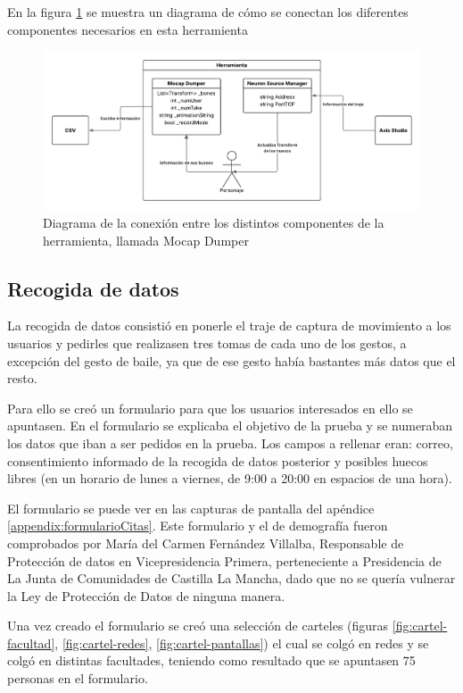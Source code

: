 En la figura \ref{fig:MocapDumper} se muestra un diagrama de cómo se conectan los diferentes componentes necesarios en esta herramienta

\begin{figure}[H]
	\centering
	\includegraphics[width=1\textwidth]{Imagenes/Vectorial/MocapDumper.pdf}
	\caption{Diagrama de la conexión entre los distintos componentes de la herramienta, llamada Mocap Dumper}
	\label{fig:MocapDumper}
\end{figure}

\subsection{Recogida de datos}
La recogida de datos consistió en ponerle el traje de captura de movimiento a los usuarios y pedirles que realizasen tres tomas de cada uno de los gestos, a excepción del gesto de baile, ya que de ese gesto había bastantes más datos que el resto.

Para ello se creó un formulario para que los usuarios interesados en ello se apuntasen. En el formulario se explicaba el objetivo de la prueba y se numeraban los datos que iban a ser pedidos en la prueba. Los campos a rellenar eran: correo, consentimiento informado de la recogida de datos posterior y posibles huecos libres (en un horario de lunes a viernes, de 9:00 a 20:00 en espacios de una hora).

El formulario se puede ver en las capturas de pantalla del apéndice \ref{appendix:formularioCitas}. Este formulario y el de demografía fueron comprobados por María del Carmen Fernández Villalba, Responsable de Protección de datos en Vicepresidencia Primera, perteneciente a Presidencia de La Junta de Comunidades de Castilla La Mancha, dado que no se quería vulnerar la Ley de Protección de Datos de ninguna manera.

Una vez creado el formulario se creó una selección de carteles (figuras \ref{fig:cartel-facultad}, \ref{fig:cartel-redes}, \ref{fig:cartel-pantallas}) el cual se colgó en redes y se colgó en distintas facultades, teniendo como resultado que se apuntasen 75 personas en el formulario.


